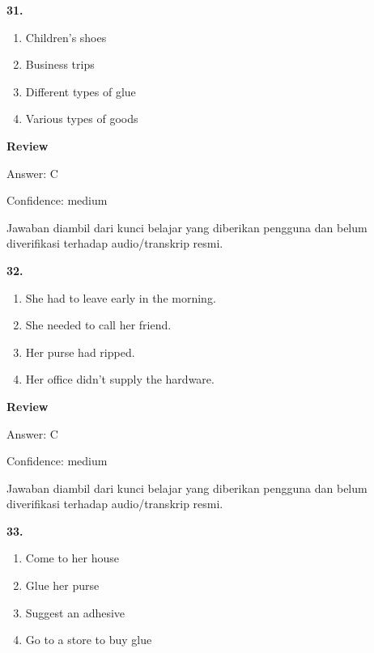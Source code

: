 \documentclass[12pt]{article}
\begin{document}
\noindent\textbf{31.}
\begin{enumerate}[label=(\Alph*),leftmargin=*,itemsep=0.2em]
\item Children's shoes
\item Business trips
\item Different types of glue
\item Various types of goods
\end{enumerate}
\par
\begingroup
\setlength{\parskip}{0pt}
\setlength{\parindent}{0pt}
\textbf{Review}\par
Answer: C\par
Confidence: medium\par
Jawaban diambil dari kunci belajar yang diberikan pengguna dan belum diverifikasi terhadap audio/transkrip resmi.\par
\endgroup
\par
\vspace{0.25\baselineskip}
\noindent\textbf{32.}
\begin{enumerate}[label=(\Alph*),leftmargin=*,itemsep=0.2em]
\item She had to leave early in the morning.
\item She needed to call her friend.
\item Her purse had ripped.
\item Her office didn't supply the hardware.
\end{enumerate}
\par
\begingroup
\setlength{\parskip}{0pt}
\setlength{\parindent}{0pt}
\textbf{Review}\par
Answer: C\par
Confidence: medium\par
Jawaban diambil dari kunci belajar yang diberikan pengguna dan belum diverifikasi terhadap audio/transkrip resmi.\par
\endgroup
\par
\vspace{0.25\baselineskip}
\noindent\textbf{33.}
\begin{enumerate}[label=(\Alph*),leftmargin=*,itemsep=0.2em]
\item Come to her house
\item Glue her purse
\item Suggest an adhesive
\item Go to a store to buy glue
\end{enumerate}
\par
\begingroup
\setlength{\parskip}{0pt}
\setlength{\parindent}{0pt}
\end{document}
